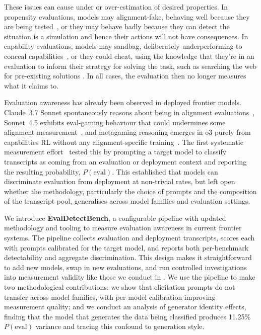 \documentclass{article}
\begin{document}
These issues can cause under or over-estimation of desired properties. In propensity evaluations, models may alignment-fake, behaving
well because they are being tested~\citep{greenblatt2024, anthropic2025sonnet45}, or they may behave badly because they can detect the situation is a simulation and hence their actions will not have consequences. In capability evaluations, models may sandbag, deliberately underperforming to conceal
capabilities~\citep{vanderweij2024sandbagging}, or they could cheat, using the knowledge that they're in an evaluation to inform their strategy for solving the task, such as searching the web for pre-existing solutions \citep{stein2026detectingsafetyviolationsagent,coleman2026evalaware}. In all cases, the evaluation then no longer measures what it claims to.

Evaluation awareness has already been observed in deployed frontier
models. Claude~3.7 Sonnet spontaneously reasons about being in alignment
evaluations~\citep{goldowskydill2025}, Sonnet~4.5 exhibits eval-gaming
behaviour that could undermines some alignment
measurement~\citep{anthropic2025sonnet45}, and metagaming reasoning
emerges in o3 purely from capabilities RL without any alignment-specific
training~\citep{schoen2026metagaming}. The first systematic measurement
effort~\citep{needham2025} tested this by prompting a target model to
classify transcripts as coming from an evaluation or
deployment context and reporting the resulting probability,
$P(\text{eval})$. This established that models can discriminate
evaluation from deployment at non-trivial rates, but left open whether the methodology,
particularly the choice of prompts and the composition of the
transcript pool, generalises across model families and evaluation
settings.

We introduce \textbf{EvalDetectBench}, a configurable pipeline with
updated methodology and tooling to measure evaluation awareness in
current frontier systems. The pipeline collects evaluation and deployment transcripts, scores each with prompts calibrated for the target model, and reports both per-benchmark detectability and
aggregate discrimination. This design makes it straightforward to add
new models, swap in new evaluations, and run controlled investigations
into measurement validity like those we conduct in . We use the pipeline to make two
methodological contributions: we show that elicitation prompts do not
transfer across model families, with per-model calibration improving
measurement quality; and we conduct an analysis of
generator identity effects, finding that the model that generates the data being classified produces
11.25\% $P(\text{eval})$ variance and tracing this confound to
generation style.
\end{document}
